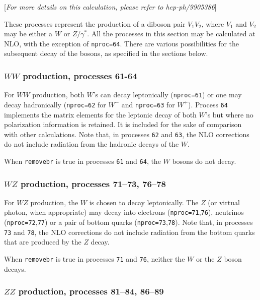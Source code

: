 \documentclass[12pt]{article}
\begin{document}
\begin{center}
[{\it For more details on this calculation, please refer to hep-ph/9905386}]
\end{center}

These processes represent the production of a diboson pair $V_1 V_2$,
where $V_1$ and $V_2$ may be either a $W$ or $Z/\gamma^*$. 
All the processes in this section may be calculated at NLO, with the exception
of {\tt nproc=64}. There are various
possibilities for the subsequent decay of the bosons, as specified in the
sections below.

\subsubsection{$WW$ production, processes 61-64}

For $WW$ production, both $W$'s can decay leptonically ({\tt nproc=61}) or one
may decay hadronically ({\tt nproc=62} for $W^-$ and {\tt nproc=63} for $W^+$).
Process {\tt 64} implements the matrix elements for the leptonic decay of
both $W$'s but where no polarization information is retained. It is included
for the sake of comparison with other calculations. Note that, in processes
{\tt 62} and {\tt 63}, the NLO corrections do not include radiation from the
hadronic decays of the $W$.

When {\tt removebr} is true in processes {\tt 61} and {\tt 64},
the $W$ bosons do not decay.

\subsubsection{$WZ$ production, processes 71--73, 76--78}

For $WZ$ production, the $W$ is chosen to decay leptonically. The $Z$ (or
virtual photon, when appropriate) may decay into electrons
({\tt nproc=71},{\tt 76}), neutrinos ({\tt nproc=72},{\tt 77}) or a
pair of bottom quarks ({\tt nproc=73},{\tt 78}).
Note that, in processes
{\tt 73} and {\tt 78}, the NLO corrections do not include radiation from the
bottom quarks that are produced by the $Z$ decay.

When {\tt removebr} is true in processes {\tt 71} and {\tt 76},
neither the $W$ or the $Z$ boson decays.

\subsubsection{$ZZ$ production, processes 81--84, 86--89}
\end{document}
